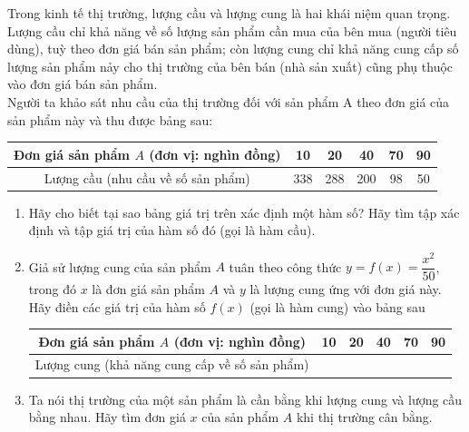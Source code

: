 \begin{bt}%
	Trong kinh tế thị trường, lượng cầu và lượng cung là hai khái niệm quan trọng. Lượng cầu chỉ khả năng về số lượng sản phẩm cần mua của bên mua (người tiêu dùng), tuỳ theo đơn giá bán sản phẩm; còn lượng cung chỉ khả năng cung cấp số lượng sản phẩm nảy cho thị trường của bên bán (nhà sản xuất) cũng phụ thuộc vào đơn giá bán sản phẩm.\\
	Người ta khảo sát nhu cầu của thị trường đối với sản phẩm $\mathrm{A}$ theo đơn giá của sản phẩm này và thu được bảng sau:
	\begin{center}
		\begin{tabular}{|c|c|c|c|c|c|}
			\hline Đơn giá sản phẩm $A$ (đơn vị: nghìn đồng) & 10 & 20 & 40 & 70 & 90 \\
			\hline Lượng cầu (nhu cầu về số sản phẩm) & 338 & 288 & 200 & 98 & 50 \\
			\hline
		\end{tabular}
	\end{center}
	\begin{enumerate}
		\item Hãy cho biết tại sao bảng giá trị trên xác định một hàm số? Hãy tìm tập xác định và tập giá trị của hàm số đó (gọi là hàm cầu).
		\item Giả sử lượng cung của sản phẩm $A$ tuân theo công thức $y=f(x)=\dfrac{x^{2}}{50}$, trong đó $x$ là đơn giá sản phẩm $A$ và $y$ là lượng cung ứng với đơn giá này. Hãy điền các giá trị của hàm số $f(x)$ (gọi là hàm cung) vào bảng sau
		\begin{center}
			\begin{tabular}{|c|l|l|l|l|l|}
				\hline Đơn giá sản phẩm $A$ (đơn vị: nghìn đồng) & 10 & 20 & 40 & 70 & 90 \\
				\hline Lượng cung (khả năng cung cấp về số sản phẩm) & & & & & \\
				\hline
			\end{tabular}
		\end{center}
		\item Ta nói thị trường của một sản phẩm là cần bằng khi lượng cung và lượng cầu bằng nhau. Hãy tìm đơn giá $x$ của sản phẩm $A$ khi thị trường cân bằng.
	\end{enumerate}
\end{bt}
